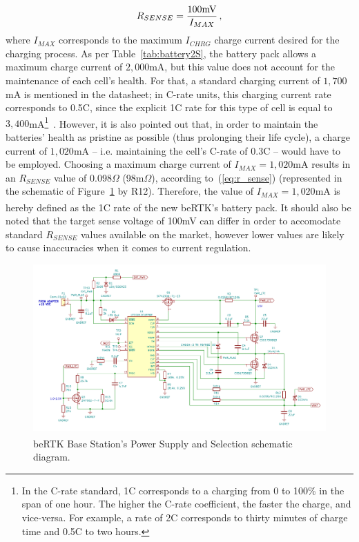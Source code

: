 \begin{equation}\label{eq:r_sense}
    R_{SENSE}=\frac{100 \textrm{mV}}{I_{MAX}}\,,\medskip
\end{equation}
where $I_{MAX}$ corresponds to the maximum $I_{CHRG}$ charge current desired for the charging process. As per Table~\ref{tab:battery2S}, the battery pack allows a maximum charge current of $2,000$mA, but this value does not account for the maintenance of each cell's health. For that, a standard charging current of $1,700$mA is mentioned in the datasheet; in C-rate units, this charging current rate corresponds to 0.5C, since the explicit 1C rate for this type of cell is equal to $3,400$mA\footnote[7]{In the C-rate standard, 1C corresponds to a charging from 0 to 100\% in the span of one hour. The higher the C-rate coefficient, the faster the charge, and vice-versa. For example, a rate of 2C corresponds to thirty minutes of charge time and 0.5C to two hours.}~\cite{C-rate}.
However, it is also pointed out that, in order to maintain the batteries' health as pristine as possible (thus prolonging their life cycle), a charge current of $1,020$mA -- i.e. maintaining the cell's C-rate of 0.3C -- would have to be employed. Choosing a maximum charge current of $I_{MAX}=1,020$mA results in an $R_{SENSE}$ value of 0.098$\Omega$ (98m$\Omega$), according to~(\ref{eq:r_sense}) (represented in the schematic of Figure~\ref{fig:LTC4012_circuit} by R12). Therefore, the value of $I_{MAX}=1,020$mA is hereby defined as the 1C rate of the new beRTK\textsuperscript{\textregistered}'s battery pack. It should also be noted that the target sense voltage of 100mV can differ in order to accomodate standard $R_{SENSE}$ values available on the market, however lower values are likely to cause inaccuracies when it comes to current regulation.

\begin{figure}[h]
	\centering
	\includegraphics[width=1.0\textwidth]{Chapters/Figures/chapter3/Power_Supply_and_Selection.pdf}
	\caption{beRTK\textsuperscript{\textregistered} Base Station's Power Supply and Selection schematic diagram.}
	\label{fig:LTC4012_circuit}
\end{figure}

